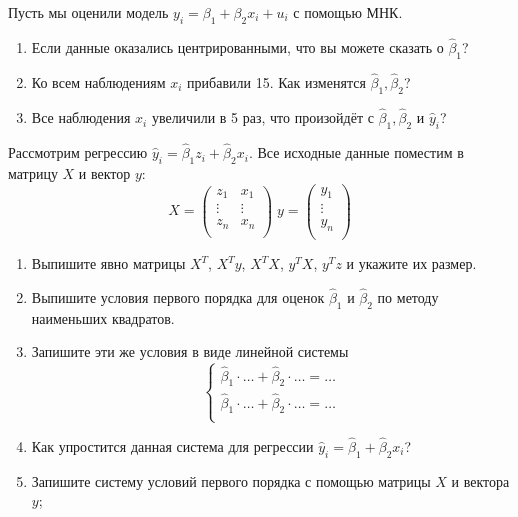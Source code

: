 \documentclass[12pt]{article}
\newcommand{\hb}{\hat{\beta}}
\newcommand{\hy}{\hat{y}}
\begin{document}

\begin{problem}
    Пусть мы оценили модель $y_i = \beta_1 + \beta_2 x_i + u_i$ с помощью МНК.

    \begin{enumerate}
    \item Если данные оказались центрированными, что вы можете сказать о $\hb_1$?
    \item Ко всем наблюдениям $x_i$ прибавили 15. Как изменятся $\hb_1, \hb_2$?
    \item Все наблюдения $x_i$ увеличили в 5 раз, что произойдёт с $\hb_1, \hb_2$ и $\hy_i$?
    \end{enumerate}
\end{problem}

\begin{problem}
    
    Рассмотрим регрессию $\hy_i = \hb_1 z_i + \hb_2 x_i$.
    Все исходные данные поместим в матрицу $X$ и вектор $y$:
    \[
    X = \begin{pmatrix}
    z_1 & x_1 \\
    \vdots & \vdots \\
    z_n & x_n \\
    \end{pmatrix} \;
    y = \begin{pmatrix}
    y_1 \\
    \vdots \\
    y_n \\
    \end{pmatrix}
    \]
    \begin{enumerate}
      \item Выпишите явно матрицы $X^T$, $X^T y$, $X^T X$, $y^T X$, $y^T z$ и укажите их размер.
      \item Выпишите условия первого порядка для оценок $\hb_1$ и $\hb_2$ по методу наименьших квадратов.
      \item Запишите эти же условия в виде линейной системы
      \[
    \begin{cases}
    \hb_1 \cdot \ldots + \hb_2 \cdot \ldots = \ldots \\
    \hb_1 \cdot \ldots + \hb_2 \cdot \ldots = \ldots \\
    \end{cases}
      \]
      \item Как упростится данная система для регрессии $\hy_i = \hb_1 + \hb_2 x_i$?
      \item Запишите систему условий первого порядка с помощью матрицы $X$ и вектора $y$;
    \end{enumerate}    
\end{problem}
\end{document}
